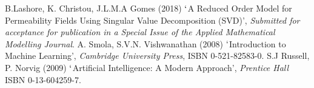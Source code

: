 \documentclass[12pts,a4paper,amsmath,amssymb,floatfix]{article}
\begin{document}
\begin{thebibliography}{99}
%
 B.Lashore, K. Christou, J.L.M.A Gomes (2018) $\lq$A Reduced Order Model for Permeability Fields Using Singular Value Decomposition (SVD)', {\it Submitted for acceptance for publication in a Special Issue of the Applied Mathematical Modelling Journal}.
%
 A. Smola, S.V.N. Vishwanathan (2008) $\lq$Introduction to Machine Learning', {\it Cambridge University Press}, ISBN 0-521-82583-0.
%
 S.J Russell, P. Norvig (2009) $\lq$Artificial Intelligence: A Modern Approach', {\it Prentice Hall} ISBN 0-13-604259-7.
%
\end{thebibliography}
\end{document}

